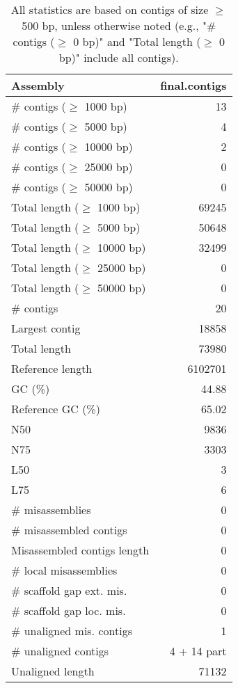 \documentclass[12pt,a4paper]{article}
\begin{document}
\begin{table}[ht]
\begin{center}
\caption{All statistics are based on contigs of size $\geq$ 500 bp, unless otherwise noted (e.g., "\# contigs ($\geq$ 0 bp)" and "Total length ($\geq$ 0 bp)" include all contigs).}
\begin{tabular}{|l*{1}{|r}|}
\hline
Assembly & final.contigs \\ \hline
\# contigs ($\geq$ 1000 bp) & 13 \\ \hline
\# contigs ($\geq$ 5000 bp) & 4 \\ \hline
\# contigs ($\geq$ 10000 bp) & 2 \\ \hline
\# contigs ($\geq$ 25000 bp) & 0 \\ \hline
\# contigs ($\geq$ 50000 bp) & 0 \\ \hline
Total length ($\geq$ 1000 bp) & 69245 \\ \hline
Total length ($\geq$ 5000 bp) & 50648 \\ \hline
Total length ($\geq$ 10000 bp) & 32499 \\ \hline
Total length ($\geq$ 25000 bp) & 0 \\ \hline
Total length ($\geq$ 50000 bp) & 0 \\ \hline
\# contigs & 20 \\ \hline
Largest contig & 18858 \\ \hline
Total length & 73980 \\ \hline
Reference length & 6102701 \\ \hline
GC (\%) & 44.88 \\ \hline
Reference GC (\%) & 65.02 \\ \hline
N50 & 9836 \\ \hline
N75 & 3303 \\ \hline
L50 & 3 \\ \hline
L75 & 6 \\ \hline
\# misassemblies & 0 \\ \hline
\# misassembled contigs & 0 \\ \hline
Misassembled contigs length & 0 \\ \hline
\# local misassemblies & 0 \\ \hline
\# scaffold gap ext. mis. & 0 \\ \hline
\# scaffold gap loc. mis. & 0 \\ \hline
\# unaligned mis. contigs & 1 \\ \hline
\# unaligned contigs & 4 + 14 part \\ \hline
Unaligned length & 71132 \\ \hline

\end{tabular}
\end{center}
\end{table}
\end{document}
